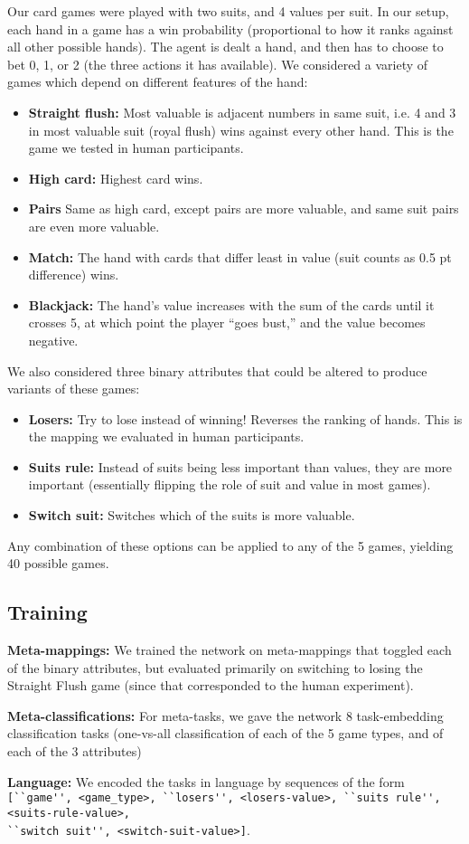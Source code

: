 Our card games were played with two suits, and 4 values per suit. In our setup, each hand in a game has a win probability (proportional to how it ranks against all other possible hands). The agent is dealt a hand, and then has to choose to bet 0, 1, or 2 (the three actions it has available). We considered a variety of games which depend on different features of the hand:
\begin{itemize}
\item \textbf{Straight flush:} Most valuable is adjacent numbers in same suit, i.e. 4 and 3 in most valuable suit (royal flush) wins against every other hand. This is the game we tested in human participants.
\item \textbf{High card:} Highest card wins.
\item \textbf{Pairs} Same as high card, except pairs are more valuable, and same suit pairs are even more valuable.
\item \textbf{Match:} The hand with cards that differ least in value (suit counts as 0.5 pt difference) wins.
\item \textbf{Blackjack:} The hand's value increases with the sum of the cards until it crosses 5, at which point the player ``goes bust,'' and the value becomes negative.
\end{itemize}
We also considered three binary attributes that could be altered to produce variants of these games:
\begin{itemize}
\item \textbf{Losers:} Try to lose instead of winning! Reverses the ranking of hands. This is the mapping we evaluated in human participants.
\item \textbf{Suits rule:} Instead of suits being less important than values, they are more important (essentially flipping the role of suit and value in most games).
\item \textbf{Switch suit:} Switches which of the suits is more valuable.
\end{itemize}
Any combination of these options can be applied to any of the 5 games, yielding 40 possible games. \par

\subsection{Training}
\textbf{Meta-mappings:} We trained the network on meta-mappings that toggled each of the binary attributes, but evaluated primarily on switching to losing the Straight Flush game (since that corresponded to the human experiment).\par
\textbf{Meta-classifications:} For meta-tasks, we gave the network 8 task-embedding classification tasks (one-vs-all classification of each of the 5 game types, and of each of the 3 attributes) \par
\textbf{Language:} We encoded the tasks in language by sequences of the form\\
\verb|[``game'', <game_type>, ``losers'', <losers-value>, ``suits rule'', <suits-rule-value>,|\\
\verb|``switch suit'', <switch-suit-value>]|.



